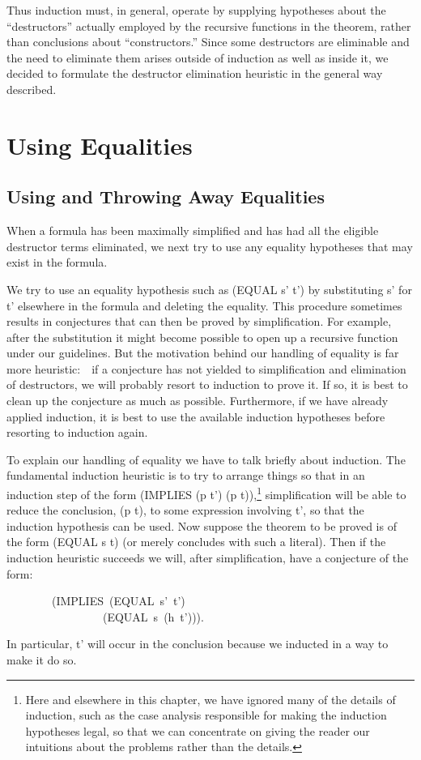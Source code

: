 \documentclass[11pt]{book}
\newenvironment{pubasis}{\begin{flushleft}\ttfamily\small}{\normalsize\rmfamily\end{flushleft}}
\newcommand{\pubdefaulttextsize}{\large}
\begin{document}
Thus induction must, in general, operate by supplying hypotheses about
the ``destructors'' actually employed by the recursive functions in the theorem,
rather than conclusions about ``constructors.''  Since
some destructors are eliminable and the need to eliminate them arises
outside of induction as well as inside it, we decided to formulate the
destructor elimination heuristic in the general way described.  
\chapter{Using Equalities}
\label{SECFERTILIZE}
\pubdefaulttextsize
\section{Using and Throwing Away Equalities}
\pubdefaulttextsize
When a formula has been maximally simplified and has had all the
eligible destructor terms eliminated, we next try to use any
equality hypotheses that may exist in the formula.

We try to use an equality hypothesis such as (EQUAL s' t') by substituting s' for t'
elsewhere in the formula and deleting the equality.
This procedure sometimes results in conjectures that can
then be proved by simplification.  For example, after the substitution
it might become possible to open up a recursive function under our guidelines.
But the motivation behind our handling of
equality is far more heuristic:~~if a conjecture has not yielded to
simplification and elimination of destructors, we will probably
resort to induction to prove it.  If so, it is best
to clean up the conjecture as much as possible.  
Furthermore, if we have already applied induction, it is best to use
the available induction hypotheses before resorting to induction again.

To explain our handling of equality we have to talk briefly about induction.
The fundamental induction heuristic is to try to arrange things so
that in an induction step of the form (IMPLIES (p t') (p t)),\footnote{Here and elsewhere in this chapter, we have ignored many of the details of induction, such as the case analysis responsible for making the induction hypotheses legal, so that we can concentrate on giving the reader our intuitions about the problems rather than the details.} simplification
will be able to reduce the conclusion, (p t), to some expression involving t', so
that the induction hypothesis can be used.  Now suppose the theorem to
be proved is of the form (EQUAL s t) (or merely concludes with such a literal).
Then if the induction heuristic succeeds we will, after simplification,
have a conjecture of the form:
\begin{pubasis}
~~~~~~~~(IMPLIES~(EQUAL~s'~t')\\
~~~~~~~~~~~~~~~~~(EQUAL~s~(h~t'))).\\
\end{pubasis}
In particular, t'
will occur in the conclusion because we inducted in a way to make it do so.
\end{document}
